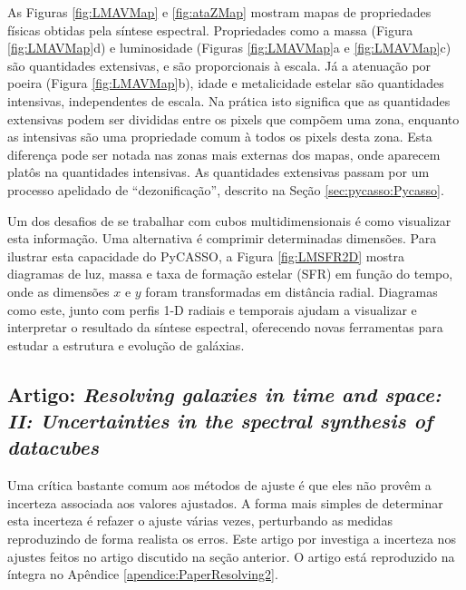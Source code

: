 As Figuras \ref{fig:LMAVMap} e \ref{fig:ataZMap} mostram mapas de propriedades
físicas obtidas pela síntese espectral. Propriedades como a massa (Figura
\ref{fig:LMAVMap}d) e luminosidade (Figuras \ref{fig:LMAVMap}a e
\ref{fig:LMAVMap}c) são quantidades extensivas, e são proporcionais à escala. Já
a atenuação por poeira (Figura \ref{fig:LMAVMap}b), idade e metalicidade estelar
são quantidades intensivas, independentes de escala. Na prática isto significa
que as quantidades extensivas podem ser divididas entre os pixels que compõem
uma zona, enquanto as intensivas são uma propriedade comum à todos os pixels
desta zona. Esta diferença pode ser notada nas zonas mais externas dos mapas,
onde aparecem platôs na quantidades intensivas. As quantidades extensivas passam
por um processo apelidado de ``dezonificação''\fixme, descrito na Seção
\ref{sec:pycasso:Pycasso}.

Um dos desafios de se trabalhar com cubos multidimensionais é como visualizar
esta informação. Uma alternativa é comprimir determinadas dimensões. Para
ilustrar esta capacidade do PyCASSO, a Figura \ref{fig:LMSFR2D} mostra diagramas
de luz, massa e taxa de formação estelar (SFR) em função do tempo, onde as
dimensões $x$ e $y$ foram transformadas em distância radial. Diagramas como
este, junto com perfis 1-D radiais e temporais ajudam a visualizar e interpretar
o resultado da síntese espectral, oferecendo novas ferramentas para estudar a
estrutura e evolução de galáxias.



\subsection{Artigo: {\em Resolving galaxies in time and space: II: Uncertainties
in the spectral synthesis of datacubes}}
\label{sec:pycasso:art:Resolving2}

Uma crítica bastante comum aos métodos de ajuste é que eles não provêm a
incerteza associada aos valores ajustados. A forma mais simples de determinar
esta incerteza é refazer o ajuste várias vezes, perturbando as medidas
reproduzindo de forma realista os erros. Este artigo por
\citet{CidFernandes2013b} investiga a incerteza nos ajustes feitos no artigo
discutido na seção anterior. O artigo está reproduzido na íntegra no Apêndice
\ref{apendice:PaperResolving2}.

